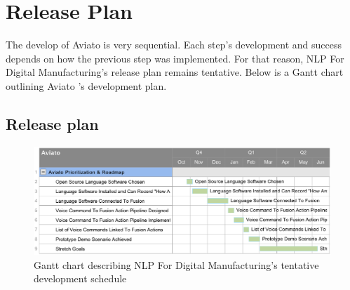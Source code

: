\documentclass[onecolumn, draftclsnofoot,10pt, compsoc]{IEEEtran}
\def \CapstoneProjectName{NLP For Digital Manufacturing}
\def \botname{Aviato }
\begin{document}
		

\section{Release Plan}
	The develop of \botname is very sequential. Each step's development and success depends on how the previous step was implemented. For that reason, \CapstoneProjectName's release plan remains tentative. Below is a Gantt chart outlining \botname's development plan.
    \subsection{Release plan}
    	\begin{figure}[H]
    		\includegraphics[width=1\textwidth]{ganttChart.eps}
    		\centering
    		\caption{Gantt chart describing \CapstoneProjectName's tentative development schedule}
   			\label{fig:mesh1}
    	\end{figure}


% 
%
\end{document}
